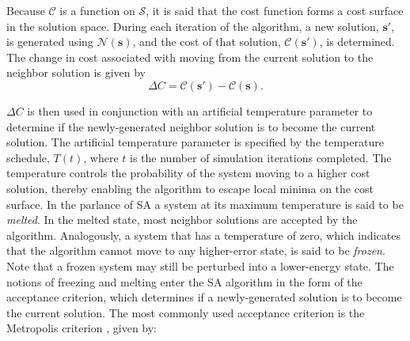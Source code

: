 \documentclass[11pt]{afthesis}
\begin{document}
	\noindent Because \begin{math} \mathcal{C} \end{math} is a function on \begin{math} \boldsymbol{\mathcal{S}} \end{math}, it is said that the cost function forms a cost surface in the solution space. During each iteration of the algorithm, a new solution, \begin{math}\boldsymbol{s}'  \end{math}, is generated using \begin{math}\boldsymbol{\mathcal{N}(\boldsymbol{s})} \end{math}, and the cost of that solution, \begin{math}\mathcal{C}(\boldsymbol{s}' ) \end{math}, is determined. The change in cost associated with moving from the current solution to the neighbor solution is given by 
	\begin{equation*} \label{eq:delta_cost}
	\Delta C =  \mathcal{C}(\boldsymbol{s}')-\mathcal{C}(\boldsymbol{s}).
	\end{equation*}
	
	\begin{math}\Delta C \end{math} is then used in conjunction with an artificial temperature parameter to determine if the newly-generated neighbor solution is to become the current solution. The artificial temperature parameter is specified by the temperature schedule, \begin{math}T(t)\end{math}, where \begin{math}t\end{math} is the number of simulation iterations completed. The temperature controls the probability of the system moving to a higher cost solution, thereby enabling the algorithm to escape local minima on the cost surface. In the parlance of SA \cite{kirkpatrick1983} a system at its maximum temperature is said to be \textit{melted}. In the melted state, most neighbor solutions are accepted by the algorithm. Analogously, a system that has a temperature of zero, which indicates that the algorithm cannot move to any higher-error state, is said to be \textit{frozen}. Note that a frozen system may still be perturbed into a lower-energy state. The notions of freezing and melting enter the SA algorithm in the form of the acceptance criterion, which determines if a newly-generated solution is to become the current solution. The most commonly used acceptance criterion is the Metropolis criterion \cite{metropolis1953}, given by:
	
\end{document}
